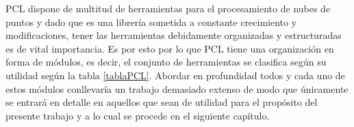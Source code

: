 \iffalse
\begin{figure}
\centering
\texttt{[image: pcl\_logo]}
\caption{Logo de PCL.}\label{fig:pcl_logo}
\end{figure}
\fi
PCL dispone de multitud de herramientas para el procesamiento de nubes de puntos y dado que es una librería sometida a constante crecimiento y modificaciones, tener las herramientas debidamente organizadas y estructuradas es de vital importancia. Es por esto por lo que PCL tiene una organización en forma de módulos\cite{PCL_modulos}, es decir, el conjunto de herramientas se clasifica según su utilidad según la tabla \ref{tablaPCL}. Abordar en profundidad todos y cada uno de estos módulos conllevaría un trabajo demasiado extenso de modo que únicamente se entrará en detalle en aquellos que sean de utilidad para el propósito del presente trabajo y a lo cual se procede en el siguiente capítulo.
